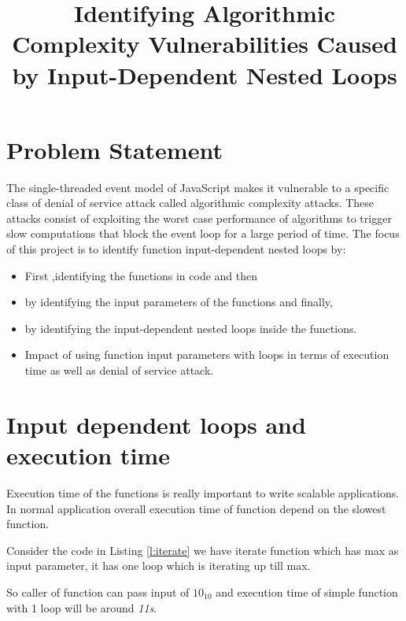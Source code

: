\documentclass[authoryear,preprint]{sigplanconf}
\begin{document}
\setlength{\pdfpageheight}{\paperheight}
\setlength{\pdfpagewidth}{\paperwidth}


\title{Identifying Algorithmic Complexity Vulnerabilities Caused by
Input-Dependent Nested Loops}

\maketitle

\section{Problem Statement}
\label{sec:problemstatement}

The single-threaded event model of JavaScript makes it vulnerable
to a specific class of denial of service attack called algorithmic
complexity attacks. These attacks consist of exploiting the worst
case performance of algorithms to trigger slow computations that
block the event loop for a large period of time. The focus of this
project is to identify function input-dependent nested loops by:
\begin{itemize}
\item First ,identifying the functions in code and then
\item by identifying the input parameters of the functions and finally,
\item by identifying the input-dependent nested loops inside the functions.
\item Impact of using function input parameters with loops in terms
of execution time as well as denial of service attack.
\end{itemize}


\section{Input dependent loops and execution time}
\label{sec:introduction}
Execution time of the functions is really important to write scalable applications. In normal application overall execution time of function depend on the slowest function.

Consider the code in Listing \ref{l:iterate} we have iterate function which has max as input parameter, it has one loop which is iterating up till max.

So caller of function can pass input of \begin{math} 10_{10} \end{math} and execution time of simple function with 1 loop will be around \textit{11s}.
\end{document}
